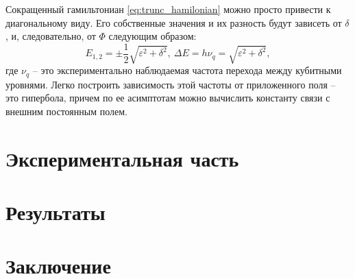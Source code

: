 \documentclass[12pt]{article}
\numberwithin{equation}{section}
\begin{document}
Сокращенный гамильтониан \eqref{eq:trunc_hamilonian} можно просто привести к диагональному виду. Его собственные значения и их разность будут зависеть от $\delta$, и, следовательно, от $\Phi$ следующим образом:
\begin{equation}
E_{1, 2} = \pm \frac{1}{2}\sqrt{\varepsilon^2 + \delta^2},\
\Delta E = h \nu_q = \sqrt{\varepsilon^2 + \delta^2},
\end{equation}
где $\nu_q$ -- это экспериментально наблюдаемая частота перехода между кубитными уровнями. Легко построить зависимость этой частоты от приложенного поля -- это гипербола, причем по ее асимптотам можно вычислить константу связи с внешним постоянным полем.

\newpage
\part{Экспериментальная часть}
\part{Результаты}
\part{Заключение}



\end{document}
